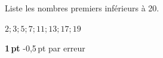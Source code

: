 
\question[1]
Liste les nombres premiers inférieurs à 20.

\vspace{10pt}{\footnotesize\raggedleft Espace pour ta démarche et tes calculs\par}
	\begin{solutionorgrid}[80pt]
	
		\vspace{10pt}
		$2; 3; 5; 7; 11; 13; 17; 19$
		
		\vspace{10pt}\textbf{1\,pt} -0,5\,pt par erreur
	\end{solutionorgrid}

